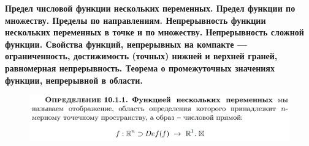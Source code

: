 \documentclass{article}
\begin{document}
\begin{figure}[h!]
    \centering
    \vspace{-1cm}
\end{figure}
\begin{figure}[h!]
    \centering
    \vspace{-1cm}
\end{figure}
\newpage\noindent
\textbf{Предел числовой функции нескольких переменных. Предел функции по множеству. Пределы по направлениям. Непрерывность функции нескольких переменных в точке и по множеству. Непрерывность сложной функции. Свойства функций, непрерывных на компакте — ограниченность, достижимость (точных) нижней и верхней граней, равномерная непрерывность. Теорема о промежуточных значениях функции, непрерывной в области.}
\begin{figure}[h!]
    \centering
    \includegraphics[width=\textwidth]{14.png}
    \vspace{-1cm}
\end{figure}
\begin{figure}[h!]
    \centering
    \vspace{-1cm}
\end{figure}
\end{document}
